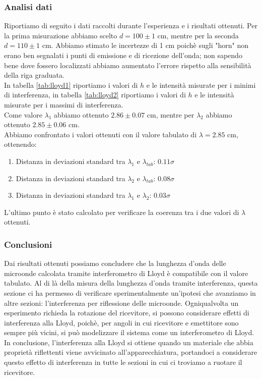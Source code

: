 \documentclass[letterpaper,12pt]{article}
\begin{document}
\subsubsection{Analisi dati}
Riportiamo di seguito i dati raccolti durante l'esperienza e i risultati ottenuti.
Per la prima misurazione abbiamo scelto $d = 100 \pm 1$ cm, mentre per la seconda $d = 110 \pm 1$ cm. Abbiamo stimato
le incertezze di 1 cm poichè sugli "horn" non erano ben segnalati i punti di emissione e di ricezione
dell'onda; non sapendo bene dove fossero localizzati abbiamo aumentato l'errore rispetto alla sensibilità della riga
graduata.\\
In tabella \ref{tab:lloyd1} riportiamo i valori di $h$ e le intensità misurate per i minimi di interferenza, 
in tabella \ref{tab:lloyd2} riportiamo i valori di $h$ e le intensità misurate per i massimi di interferenza.\\
Come valore $\lambda_1$ abbiamo ottenuto $2.86 \pm 0.07$ cm, mentre per $\lambda_2$ abbiamo ottenuto $2.85 \pm 0.06$ cm.\\
Abbiamo confrontato i valori ottenuti con il valore tabulato di $\lambda = 2.85$ cm, ottenendo:
\begin{enumerate}
    \item Distanza in deviazioni standard tra $\lambda_1$ e $\lambda_{tab}$: $0.11 \sigma$
    \item Distanza in deviazioni standard tra $\lambda_2$ e $\lambda_{tab}$: $0.08 \sigma$
    \item Distanza in deviazioni standard tra $\lambda_1$ e $\lambda_2$: $0.03 \sigma$
\end{enumerate}
L'ultimo punto è stato calcolato per verificare la coerenza tra i due valori di $\lambda$ ottenuti.\\

\subsubsection{Conclusioni}
Dai risultati ottenuti possiamo concludere che la lunghezza d'onda delle microonde calcolata tramite interferometro 
di Lloyd è compatibile con il valore tabulato. 
Al di là della misura della lunghezza d'onda tramite interferenza, questa sezione ci ha permesso di verificare
sperimentalmente un'ipotesi che avanziamo in altre sezioni: l'interferenza per riflessione delle microonde. Ogniqualvolta
un esperimento richieda la rotazione del ricevitore, si possono considerare effetti di interferenza alla Lloyd,
poichè, per angoli in cui ricevitore e emettitore sono sempre più vicini, si può modelizzare il sistema come 
un interferometro di Lloyd.\\
In conclusione, l'interferenza alla Lloyd si ottiene quando un materiale che abbia proprietà riflettenti viene
avvicinato all'apparecchiatura, portandoci a considerare questo effetto di interferenza in tutte le sezioni in cui 
ci troviamo a ruotare il ricevitore.\\
\end{document}
